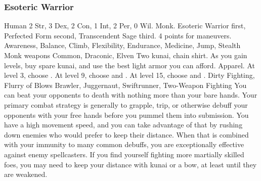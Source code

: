        \subsubsection{Esoteric Warrior}
             Human
             2 Str, 3 Dex, 2 Con, 1 Int, 2 Per, 0 Wil.
             Monk.
             Esoteric Warrior first, Perfected Form second, Transcendent Sage third.
             4 points for maneuvers.
             Awareness, Balance, Climb, Flexibility, Endurance, Medicine, Jump, Stealth
             Monk weapons
             Common, Draconic, Elven
             Two kunai, chain shirt. As you gain levels, buy spare kunai, and use the best light armor you can afford.
             Apparel.
                At level 3, choose .
                At level 9, choose  and .
                At level 15, choose  and .
             Dirty Fighting, Flurry of Blows
             Brawler, Juggernaut, Swiftrunner, Two-Weapon Fighting
             You can beat your opponents to death with nothing more than your bare hands.
            Your primary combat strategy is generally to grapple, trip, or otherwise debuff your opponents with your free hands before you pummel them into submission.
            You have a high movement speed, and you can take advantage of that by rushing down enemies who would prefer to keep their distance.
            When that is combined with your immunity to many common debuffs, you are exceptionally effective against enemy spellcasters.
            If you find yourself fighting more martially skilled foes, you may need to keep your distance with kunai or a bow, at least until they are weakened.

